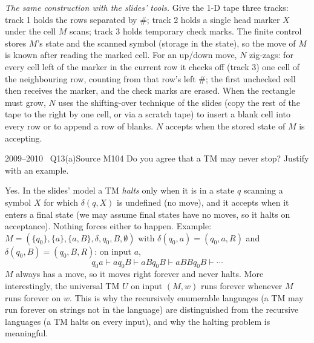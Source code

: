 \documentclass[11pt,a4paper]{article}
\begin{document}
\begin{solution}
\emph{The same construction with the slides' tools.} Give the 1-D tape three tracks: track 1 holds the rows separated by $\#$; track 2 holds a single head marker $X$ under the cell $M$ scans; track 3 holds temporary check marks. The finite control stores $M$'s state and the scanned symbol (storage in the state), so the move of $M$ is known after reading the marked cell. For an up/down move, $N$ zig-zags: for every cell left of the marker in the current row it checks off (track 3) one cell of the neighbouring row, counting from that row's left $\#$; the first unchecked cell then receives the marker, and the check marks are erased. When the rectangle must grow, $N$ uses the shifting-over technique of the slides (copy the rest of the tape to the right by one cell, or via a scratch tape) to insert a blank cell into every row or to append a row of blanks. $N$ accepts when the stored state of $M$ is accepting.
\end{solution}

\begin{question}{2009--2010 \textbullet\ Q13(a)}{Source M10}{4}
Do you agree that a TM may never stop? Justify with an example.
\end{question}
\begin{solution}
Yes. In the slides' model a TM \emph{halts} only when it is in a state $q$ scanning a symbol $X$ for which $\delta(q,X)$ is undefined (no move), and it accepts when it enters a final state (we may assume final states have no moves, so it halts on acceptance). Nothing forces either to happen. Example: $M=(\{q_0\},\{a\},\{a,B\},\delta,q_0,B,\emptyset)$ with $\delta(q_0,a)=(q_0,a,R)$ and $\delta(q_0,B)=(q_0,B,R)$: on input $a$,
\[ q_0a\vdash aq_0B\vdash aBq_0B\vdash aBBq_0B\vdash\cdots \]
$M$ always has a move, so it moves right forever and never halts. More interestingly, the universal TM $U$ on input $(M,w)$ runs forever whenever $M$ runs forever on $w$. This is why the recursively enumerable languages (a TM may run forever on strings not in the language) are distinguished from the recursive languages (a TM halts on every input), and why the halting problem is meaningful.
\end{solution}
\end{document}
